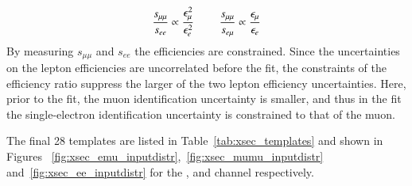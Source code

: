 \begin{equation}
\frac{s_{\mu\mu}}{s_{ee}} \propto \frac{\epsilon_{\mu}^2}{\epsilon_{e}^2} \hspace{0.8cm} \frac{s_{\mu\mu}}{s_{e\mu}} \propto \frac{\epsilon_{\mu}}{\epsilon_{e}}
\label{eq:xsec_lepeffs}
\end{equation}
By measuring $s_{\mu\mu}$ and $s_{ee}$ the efficiencies are constrained.
Since the uncertainties on the lepton efficiencies are uncorrelated before the fit, the constraints of the efficiency ratio suppress the larger of the two lepton efficiency uncertainties.
Here, prior to the fit, the muon identification uncertainty is smaller, and thus in the fit the single-electron identification uncertainty is constrained to that of the muon.

The final 28 templates are listed in Table~\ref{tab:xsec_templates} and shown in Figures 
~\ref{fig:xsec_emu_inputdistr},~\ref{fig:xsec_mumu_inputdistr} and~\ref{fig:xsec_ee_inputdistr} for the \emu, \mumu and \ee channel respectively.




